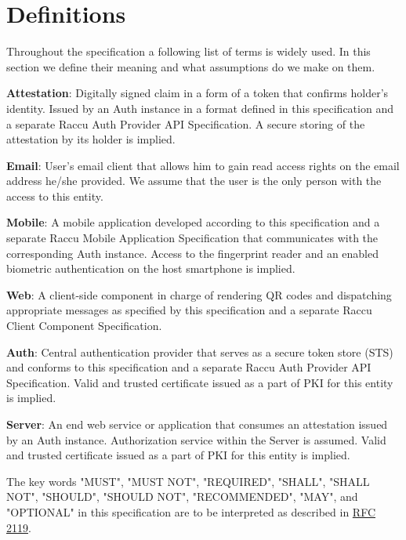 \section{Definitions}
Throughout the specification a following list of terms is widely used. In this section we define their meaning 
and what assumptions do we make on them.

\medskip
\textbf{Attestation}: Digitally signed claim in a form of a token that confirms holder's identity. Issued by 
an Auth instance in a format defined in this specification and a separate Raccu Auth Provider API Specification. 
A secure storing of the attestation by its holder is implied.

\medskip
\textbf{Email}: User's email client that allows him to gain read access rights on the email address he/she 
provided. We assume that the user is the only person with the access to this entity.

\medskip
\textbf{Mobile}: A mobile application developed according to this specification and a separate Raccu Mobile 
Application Specification that communicates with the corresponding Auth instance. Access to the fingerprint 
reader and an enabled biometric authentication on the host smartphone is implied.

\medskip
\textbf{Web}: A client-side component in charge of rendering QR codes and dispatching appropriate messages 
as specified by this specification and a separate Raccu Client Component Specification.

\medskip
\textbf{Auth}: Central authentication provider that serves as a secure token store (STS) and conforms to 
this specification and a separate Raccu Auth Provider API Specification. Valid and trusted certificate 
issued as a part of PKI for this entity is implied.

\medskip
\textbf{Server}: An end web service or application that consumes an attestation issued by an Auth instance. 
Authorization service within the Server is assumed. Valid and trusted certificate issued as a part of PKI 
for this entity is implied.

\medskip
The key words "MUST", "MUST NOT", "REQUIRED", "SHALL", "SHALL NOT", "SHOULD", "SHOULD NOT", "RECOMMENDED", 
"MAY", and "OPTIONAL" in this specification are to be interpreted as described in 
\href{https://tools.ietf.org/html/rfc2119}{RFC 2119}.